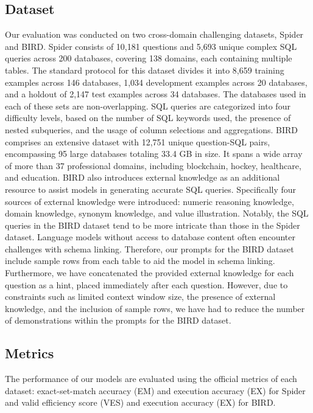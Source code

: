 \subsection{Dataset}
Our evaluation was conducted on two cross-domain challenging datasets, Spider and BIRD. Spider consists of 10,181 questions and 5,693 unique complex SQL queries across 200 databases, covering 138 domains, each containing multiple tables. The standard protocol for this dataset divides it into 8,659 training examples across 146 databases, 1,034 development examples across 20 databases, and a holdout of 2,147 test examples across 34 databases. The databases used in each of these sets are non-overlapping. SQL queries are categorized into four difficulty levels, based on the number of SQL keywords used, the presence of nested subqueries, and the usage of column selections and aggregations. 
BIRD comprises an extensive dataset with 12,751 unique question-SQL pairs, encompassing 95 large databases totaling 33.4 GB in size. It spans a wide array of more than 37 professional domains, including blockchain, hockey, healthcare, and education. BIRD also introduces external knowledge as an additional resource to assist models in generating accurate SQL queries. Specifically four sources of external knowledge were introduced: numeric reasoning knowledge, domain knowledge, synonym knowledge, and value illustration. Notably, the SQL queries in the BIRD dataset tend to be more intricate than those in the Spider dataset. Language models without access to database content often encounter challenges with schema linking. Therefore, our prompts for the BIRD dataset include sample rows from each table to aid the model in schema linking.
Furthermore, we have concatenated the provided external knowledge for each question as a hint, placed immediately after each question. However, due to constraints such as limited context window size, the presence of external knowledge, and the inclusion of sample rows, we have had to reduce the number of demonstrations within the prompts for the BIRD dataset.

\subsection{Metrics}
The performance of our models are evaluated using the official metrics of each dataset: exact-set-match accuracy (EM) and execution accuracy (EX) for Spider and valid efficiency score (VES) and execution accuracy (EX) for BIRD. 

